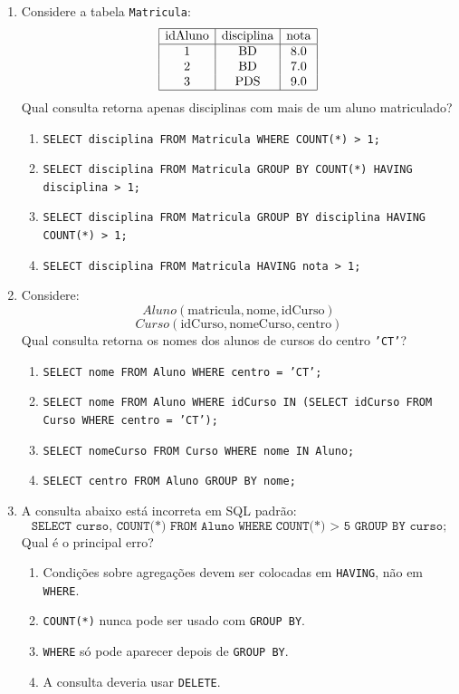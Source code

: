 \documentclass[12pt,a4paper]{article}
\begin{document}
\begin{enumerate}[resume,label=\textbf{Q\arabic*.}]
\item Considere a tabela \texttt{Matricula}:
\[
\begin{array}{|c|c|c|}
\hline
\text{idAluno} & \text{disciplina} & \text{nota}\\
\hline
1 & \text{BD} & 8.0\\
2 & \text{BD} & 7.0\\
3 & \text{PDS} & 9.0\\
\hline
\end{array}
\]
Qual consulta retorna apenas disciplinas com mais de um aluno matriculado?

\begin{enumerate}[label=\alph*)]
    \item \texttt{SELECT disciplina FROM Matricula WHERE COUNT(*) > 1;}
    \item \texttt{SELECT disciplina FROM Matricula GROUP BY COUNT(*) HAVING disciplina > 1;}
    \item \texttt{SELECT disciplina FROM Matricula GROUP BY disciplina HAVING COUNT(*) > 1;}
    \item \texttt{SELECT disciplina FROM Matricula HAVING nota > 1;}
\end{enumerate}

\item Considere:
\[
Aluno(\text{matricula}, \text{nome}, \text{idCurso})
\]
\[
Curso(\text{idCurso}, \text{nomeCurso}, \text{centro})
\]
Qual consulta retorna os nomes dos alunos de cursos do centro \texttt{'CT'}?

\begin{enumerate}[label=\alph*)]
    \item \texttt{SELECT nome FROM Aluno WHERE centro = 'CT';}
    \item \texttt{SELECT nome FROM Aluno WHERE idCurso IN (SELECT idCurso FROM Curso WHERE centro = 'CT');}
    \item \texttt{SELECT nomeCurso FROM Curso WHERE nome IN Aluno;}
    \item \texttt{SELECT centro FROM Aluno GROUP BY nome;}
\end{enumerate}

\item A consulta abaixo está incorreta em SQL padrão:
\[
\texttt{SELECT curso, COUNT(*) FROM Aluno WHERE COUNT(*) > 5 GROUP BY curso;}
\]
Qual é o principal erro?

\begin{enumerate}[label=\alph*)]
    \item Condições sobre agregações devem ser colocadas em \texttt{HAVING}, não em \texttt{WHERE}.
    \item \texttt{COUNT(*)} nunca pode ser usado com \texttt{GROUP BY}.
    \item \texttt{WHERE} só pode aparecer depois de \texttt{GROUP BY}.
    \item A consulta deveria usar \texttt{DELETE}.
\end{enumerate}


\end{enumerate}
\end{document}
